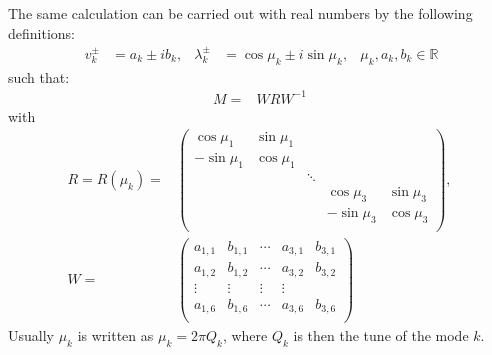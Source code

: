 The same calculation can be carried out with real numbers by the following definitions:
\begin{align}\
v_k^\pm &= a_k\pm ib_k, & \lambda_k^\pm &= \cos \mu_k \pm i \sin \mu_k, &
\mu_k, a_k, b_k \in \mathbb{R}
\end{align}
such that:
\begin{align}\label{opt:eqn:1:1}
M=&W R W^{-1}
\end{align}
with
\begin{align}
R=R(\mu_k)=&\left(
\begin{array}{ccccc}
\cos \mu_1 & \sin \mu_1  &  & &\\
-\sin \mu_1 & \cos \mu_1 &  & &\\
&    & \ddots & &\\
& & & \cos \mu_3 & \sin \mu_3 \\
& & & -\sin \mu_3 & \cos \mu_3 \\
\end{array}
\right), \\
W=&\left(
\begin{array}{ccccc}
a_{1,1} & b_{1,1} & \cdots & a_{3,1} & b_{3,1} \\
a_{1,2} & b_{1,2} & \cdots & a_{3,2} & b_{3,2} \\
\vdots    & \vdots    & \vdots & \vdots\\
a_{1,6} & b_{1,6} & \cdots & a_{3,6} & b_{3,6} \\
\end{array}
\right)
\end{align}
Usually $\mu_k$ is written as $\mu_k=2\pi Q_k$, where $Q_k$ is then the tune of the mode $k$.
